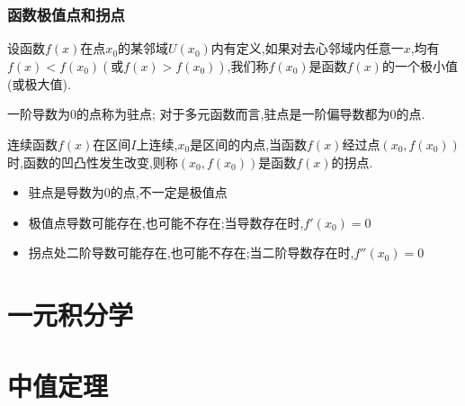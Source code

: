 \subsection{函数极值点和拐点}

\begin{definition}[极值点]
	设函数$f(x)$在点$x_{0}$的某邻域$U(x_{0})$内有定义,如果对去心邻域内任意一$x$,均有$f(x)<f(x_{0})(\text{或}f(x)>f(x_{0}))$,我们称$f(x_{0})$是函数$f(x)$的一个极小值(或极大值).
\end{definition}
\begin{definition}[驻点]
	一阶导数为$0$的点称为驻点; 对于多元函数而言,驻点是一阶偏导数都为$0$的点.
\end{definition}
\begin{definition}[拐点]
	连续函数$f(x)$在区间$I$上连续,$x_{0}$是区间的内点,当函数$f(x)$经过点$(x_{0},f(x_{0}))$时,函数的凹凸性发生改变,则称$(x_{0},f(x_{0}))$是函数$f(x)$的拐点.
\end{definition}
\begin{anymark}[注]
	\begin{itemize}
		\item 驻点是导数为$0$的点,不一定是极值点
		\item 极值点导数可能存在,也可能不存在;当导数存在时,$f'(x_{0})=0$
		\item 拐点处二阶导数可能存在,也可能不存在;当二阶导数存在时,$f''(x_{0})=0$
	\end{itemize}
\end{anymark}


\chapter{一元积分学}
\chapter{中值定理}
